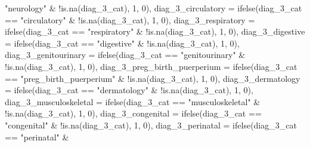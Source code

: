 \documentclass[
]{article}
\newenvironment{Shaded}{\begin{snugshade}}{\end{snugshade}}
\newcommand{\AttributeTok}[1]{\textcolor[rgb]{0.77,0.63,0.00}{#1}}
\newcommand{\DecValTok}[1]{\textcolor[rgb]{0.00,0.00,0.81}{#1}}
\newcommand{\FunctionTok}[1]{\textcolor[rgb]{0.00,0.00,0.00}{#1}}
\newcommand{\NormalTok}[1]{#1}
\newcommand{\SpecialCharTok}[1]{\textcolor[rgb]{0.00,0.00,0.00}{#1}}
\newcommand{\StringTok}[1]{\textcolor[rgb]{0.31,0.60,0.02}{#1}}
\begin{document}
\begin{Shaded}
\begin{Highlighting}[]
            \StringTok{"neurology"} \SpecialCharTok{\&} \SpecialCharTok{!}\FunctionTok{is.na}\NormalTok{(diag\_3\_cat), }\DecValTok{1}\NormalTok{, }\DecValTok{0}\NormalTok{),}
        \AttributeTok{diag\_3\_circulatory =} \FunctionTok{ifelse}\NormalTok{(diag\_3\_cat }\SpecialCharTok{==} \StringTok{"circulatory"} \SpecialCharTok{\&}
            \SpecialCharTok{!}\FunctionTok{is.na}\NormalTok{(diag\_3\_cat), }\DecValTok{1}\NormalTok{, }\DecValTok{0}\NormalTok{), }\AttributeTok{diag\_3\_respiratory =} \FunctionTok{ifelse}\NormalTok{(diag\_3\_cat }\SpecialCharTok{==}
            \StringTok{"respiratory"} \SpecialCharTok{\&} \SpecialCharTok{!}\FunctionTok{is.na}\NormalTok{(diag\_3\_cat), }\DecValTok{1}\NormalTok{,}
            \DecValTok{0}\NormalTok{), }\AttributeTok{diag\_3\_digestive =} \FunctionTok{ifelse}\NormalTok{(diag\_3\_cat }\SpecialCharTok{==}
            \StringTok{"digestive"} \SpecialCharTok{\&} \SpecialCharTok{!}\FunctionTok{is.na}\NormalTok{(diag\_3\_cat), }\DecValTok{1}\NormalTok{, }\DecValTok{0}\NormalTok{),}
        \AttributeTok{diag\_3\_genitourinary =} \FunctionTok{ifelse}\NormalTok{(diag\_3\_cat }\SpecialCharTok{==}
            \StringTok{"genitourinary"} \SpecialCharTok{\&} \SpecialCharTok{!}\FunctionTok{is.na}\NormalTok{(diag\_3\_cat), }\DecValTok{1}\NormalTok{,}
            \DecValTok{0}\NormalTok{), }\AttributeTok{diag\_3\_preg\_birth\_puerperium =} \FunctionTok{ifelse}\NormalTok{(diag\_3\_cat }\SpecialCharTok{==}
            \StringTok{"preg\_birth\_puerperium"} \SpecialCharTok{\&} \SpecialCharTok{!}\FunctionTok{is.na}\NormalTok{(diag\_3\_cat),}
            \DecValTok{1}\NormalTok{, }\DecValTok{0}\NormalTok{), }\AttributeTok{diag\_3\_dermatology =} \FunctionTok{ifelse}\NormalTok{(diag\_3\_cat }\SpecialCharTok{==}
            \StringTok{"dermatology"} \SpecialCharTok{\&} \SpecialCharTok{!}\FunctionTok{is.na}\NormalTok{(diag\_3\_cat), }\DecValTok{1}\NormalTok{,}
            \DecValTok{0}\NormalTok{), }\AttributeTok{diag\_3\_musculoskeletal =} \FunctionTok{ifelse}\NormalTok{(diag\_3\_cat }\SpecialCharTok{==}
            \StringTok{"musculoskeletal"} \SpecialCharTok{\&} \SpecialCharTok{!}\FunctionTok{is.na}\NormalTok{(diag\_3\_cat),}
            \DecValTok{1}\NormalTok{, }\DecValTok{0}\NormalTok{), }\AttributeTok{diag\_3\_congenital =} \FunctionTok{ifelse}\NormalTok{(diag\_3\_cat }\SpecialCharTok{==}
            \StringTok{"congenital"} \SpecialCharTok{\&} \SpecialCharTok{!}\FunctionTok{is.na}\NormalTok{(diag\_3\_cat), }\DecValTok{1}\NormalTok{, }\DecValTok{0}\NormalTok{),}
        \AttributeTok{diag\_3\_perinatal =} \FunctionTok{ifelse}\NormalTok{(diag\_3\_cat }\SpecialCharTok{==} \StringTok{"perinatal"} \SpecialCharTok{\&}

\end{Highlighting}
\end{Shaded}
\end{document}
